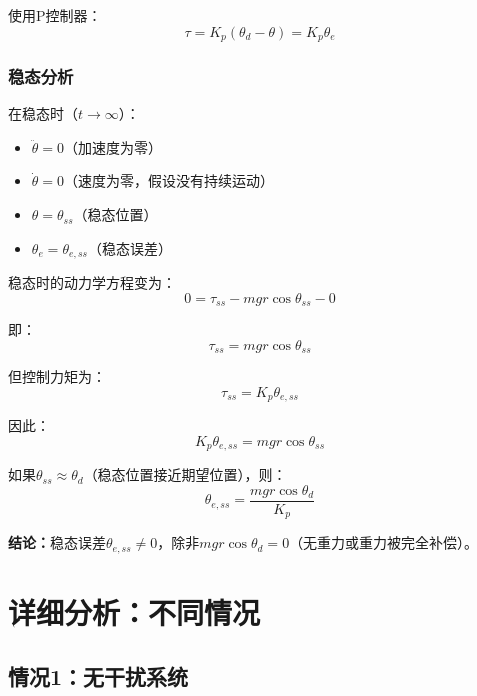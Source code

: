 \documentclass[12pt,a4paper]{article}
\begin{document}
使用P控制器：
\begin{equation}
\tau = K_p(\theta_d - \theta) = K_p \theta_e
\end{equation}

\subsubsection{稳态分析}

在稳态时（$t \to \infty$）：
\begin{itemize}
\item $\ddot{\theta} = 0$（加速度为零）
\item $\dot{\theta} = 0$（速度为零，假设没有持续运动）
\item $\theta = \theta_{ss}$（稳态位置）
\item $\theta_e = \theta_{e,ss}$（稳态误差）
\end{itemize}

稳态时的动力学方程变为：
\begin{equation}
0 = \tau_{ss} - mgr\cos\theta_{ss} - 0
\end{equation}

即：
\begin{equation}
\tau_{ss} = mgr\cos\theta_{ss}
\end{equation}

但控制力矩为：
\begin{equation}
\tau_{ss} = K_p \theta_{e,ss}
\end{equation}

因此：
\begin{equation}
K_p \theta_{e,ss} = mgr\cos\theta_{ss}
\end{equation}

如果$\theta_{ss} \approx \theta_d$（稳态位置接近期望位置），则：
\begin{equation}
\theta_{e,ss} = \frac{mgr\cos\theta_d}{K_p}
\end{equation}

\textbf{结论：}稳态误差$\theta_{e,ss} \neq 0$，除非$mgr\cos\theta_d = 0$（无重力或重力被完全补偿）。

\section{详细分析：不同情况}

\subsection{情况1：无干扰系统}
\end{document}
